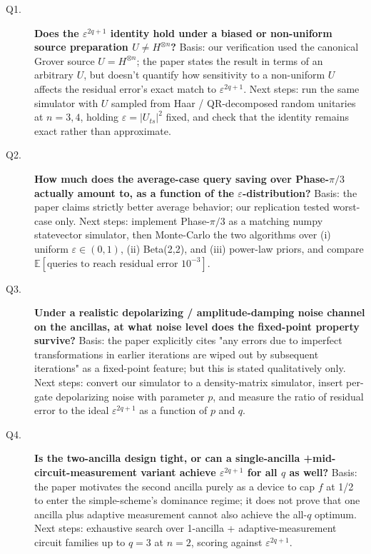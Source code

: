 \begin{description}
  \item[Q1.] \textbf{Does the \(\varepsilon^{2q+1}\) identity hold under a
    biased or non-uniform source preparation \(U\ne H^{\otimes n}\)?}
    Basis: our verification used the canonical Grover source
    \(U = H^{\otimes n}\); the paper states the result in terms of an
    arbitrary \(U\), but doesn't quantify how sensitivity to a
    non-uniform \(U\) affects the residual error's exact match to
    \(\varepsilon^{2q+1}\). Next steps: run the same simulator with
    \(U\) sampled from Haar / QR-decomposed random unitaries at
    \(n\!=\!3,4\), holding \(\varepsilon=|U_{ts}|^2\) fixed, and
    check that the identity remains exact rather than approximate.

  \item[Q2.] \textbf{How much does the average-case query saving over
    Phase-\(\pi/3\) actually amount to, as a function of the
    \(\varepsilon\)-distribution?}
    Basis: the paper claims strictly better average behavior; our
    replication tested worst-case only. Next steps: implement Phase-\(\pi/3\)
    as a matching numpy statevector simulator, then Monte-Carlo the two
    algorithms over (i) uniform \(\varepsilon\in(0,1)\), (ii) Beta(2,2),
    and (iii) power-law priors, and compare \(\mathbb{E}[\text{queries to
    reach residual error }10^{-3}]\).

  \item[Q3.] \textbf{Under a realistic depolarizing / amplitude-damping
    noise channel on the ancillas, at what noise level does the
    fixed-point property survive?}
    Basis: the paper explicitly cites "any errors due to imperfect
    transformations in earlier iterations are wiped out by subsequent
    iterations" as a fixed-point feature; but this is stated qualitatively
    only. Next steps: convert our simulator to a density-matrix simulator,
    insert per-gate depolarizing noise with parameter \(p\), and measure
    the ratio of residual error to the ideal \(\varepsilon^{2q+1}\) as a
    function of \(p\) and \(q\).

  \item[Q4.] \textbf{Is the two-ancilla design tight, or can a single-ancilla
    +mid-circuit-measurement variant achieve \(\varepsilon^{2q+1}\) for all
    \(q\) as well?}
    Basis: the paper motivates the second ancilla purely as a device to
    cap \(f\) at 1/2 to enter the simple-scheme's dominance regime; it
    does not prove that one ancilla plus adaptive measurement cannot
    also achieve the all-\(q\) optimum. Next steps: exhaustive search
    over 1-ancilla + adaptive-measurement circuit families up to \(q=3\)
    at \(n=2\), scoring against \(\varepsilon^{2q+1}\).


\end{description}
